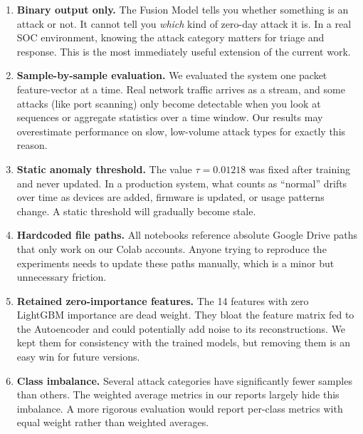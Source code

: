\documentclass[12pt,a4paper]{report}
\begin{document}
\begin{enumerate}
  \item \textbf{Binary output only.} The Fusion Model tells you whether something
        is an attack or not. It cannot tell you \textit{which} kind of zero-day
        attack it is. In a real SOC environment, knowing the attack category matters
        for triage and response. This is the most immediately useful extension of
        the current work.

  \item \textbf{Sample-by-sample evaluation.} We evaluated the system one packet
        feature-vector at a time. Real network traffic arrives as a stream, and
        some attacks (like port scanning) only become detectable when you look at
        sequences or aggregate statistics over a time window. Our results may
        overestimate performance on slow, low-volume attack types for exactly this
        reason.

  \item \textbf{Static anomaly threshold.} The value $\tau = 0.01218$ was fixed
        after training and never updated. In a production system, what counts as
        ``normal'' drifts over time as devices are added, firmware is updated, or
        usage patterns change. A static threshold will gradually become stale.

  \item \textbf{Hardcoded file paths.} All notebooks reference absolute Google
        Drive paths that only work on our Colab accounts. Anyone trying to
        reproduce the experiments needs to update these paths manually, which is
        a minor but unnecessary friction.

  \item \textbf{Retained zero-importance features.} The 14 features with zero
        LightGBM importance are dead weight. They bloat the feature matrix fed
        to the Autoencoder and could potentially add noise to its reconstructions.
        We kept them for consistency with the trained models, but removing them
        is an easy win for future versions.

  \item \textbf{Class imbalance.} Several attack categories have significantly
        fewer samples than others. The weighted average metrics in our reports
        largely hide this imbalance. A more rigorous evaluation would report
        per-class metrics with equal weight rather than weighted averages.
\end{enumerate}
\end{document}
